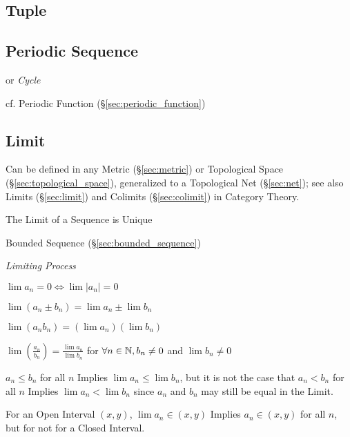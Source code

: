 \subsection{Tuple}\label{sec:tuple}

\subsection{Periodic Sequence}\label{sec:periodic_sequence}

or \emph{Cycle}

\fist cf. Periodic Function (\S\ref{sec:periodic_function})



\subsection{Limit}\label{sec:sequence_limit}

Can be defined in any Metric (\S\ref{sec:metric}) or Topological Space
(\S\ref{sec:topological_space}), generalized to a Topological Net
(\S\ref{sec:net}); see also Limits (\S\ref{sec:limit}) and Colimits
(\S\ref{sec:colimit}) in Category Theory.

The Limit of a Sequence is Unique

Bounded Sequence (\S\ref{sec:bounded_sequence})

\emph{Limiting Process}

$\lim a_n = 0 \Leftrightarrow \lim |a_n| = 0$

$\lim (a_n \pm b_n) = \lim a_n \pm \lim b_n$

$\lim (a_n b_n) = (\lim a_n) (\lim b_n)$

$\lim (\frac{a_n}{b_n}) = \frac{\lim a_n}{\lim b_n}$ for $\forall
n \in \mathbb{N}, b_n \neq 0$ and $\lim b_n \neq 0$

$a_n \leq b_n$ for all $n$ Implies $\lim a_n \leq \lim b_n$, but it is
not the case that $a_n < b_n$ for all $n$ Implies $\lim a_n < \lim
b_n$ since $a_n$ and $b_n$ may still be equal in the Limit.

For an Open Interval $(x,y)$, $\lim a_n \in (x,y)$ Implies $a_n \in
(x,y)$ for all $n$, but for not for a Closed Interval.

